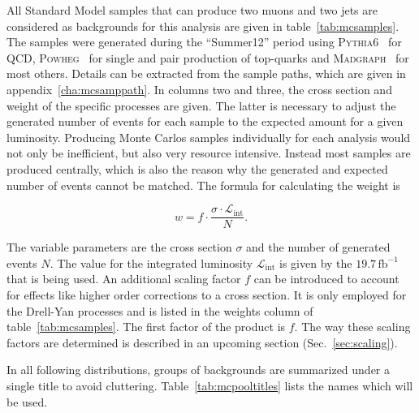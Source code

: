 All Standard Model samples that can produce two muons and two jets are considered as backgrounds for this analysis are given in table~\ref{tab:mcsamples}. The samples were generated during the ``Summer12'' period using \textsc{Pythia6}~\cite{pythia6} for QCD, \textsc{Powheg}~\cite{powheg,powhegst,powhegtt} for single and pair production of top-quarks and \textsc{Madgraph}~\cite{madgraph5} for most others. Details can be extracted from the sample paths, which are given in appendix~\ref{cha:mcsamppath}. In columns two and three, the cross section and weight of the specific processes are given. The latter is necessary to adjust the generated number of events for each sample to the expected amount for a given luminosity. Producing Monte Carlos samples individually for each analysis would not only be inefficient, but also very resource intensive. Instead most samples are produced centrally, which is also the reason why the generated and expected number of events cannot be matched. The formula for calculating the weight is

\begin{equation}
  \label{eq:weight}
  w = f \cdot \frac{\sigma \cdot \mathcal{L}_{\text{int}}}{N}.
\end{equation}

\noindent The variable parameters are the cross section $\sigma$ and the number of generated events $N$. The value for the integrated luminosity $\mathcal{L}_{\text{int}}$ is given by the $19.7\,\text{fb}^{-1}$ that is being used. An additional scaling factor $f$ can be introduced to account for effects like higher order corrections to a cross section. It is only employed for the Drell-Yan processes and is listed in the weights column of table~\ref{tab:mcsamples}. The first factor of the product is $f$. The way these scaling factors are determined is described in an upcoming section (Sec.~\ref{sec:scaling}).

In all following distributions, groups of backgrounds are summarized under a single title to avoid cluttering. Table~\ref{tab:mcpooltitles} lists the names which will be used.

